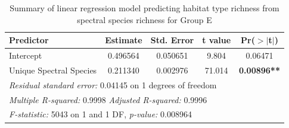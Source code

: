 \begin{table}[ht]
\centering
\caption{Summary of linear regression model predicting habitat type richness from spectral species richness for Group E}
\begin{tabular}{lcccc}
\hline
\textbf{Predictor} & \textbf{Estimate} & \textbf{Std. Error} & \textbf{t value} & \textbf{Pr($>$$|$t$|$)} \\
\hline
Intercept & 0.496564 & 0.050651 & 9.804 & 0.06471 \\
Unique Spectral Species & 0.211340 & 0.002976 & 71.014 & \textbf{0.00896**} \\
\hline
\multicolumn{5}{l}{\textit{Residual standard error:} 0.04145 on 1 degrees of freedom} \\
\multicolumn{5}{l}{\textit{Multiple R-squared:} 0.9998 \quad \textit{Adjusted R-squared:} 0.9996} \\
\multicolumn{5}{l}{\textit{F-statistic:} 5043 on 1 and 1 DF, \quad \textit{p-value:} 0.008964} \\
\hline
\end{tabular}
\label{tab:lm_plantspecies_spectral}
\end{table}

